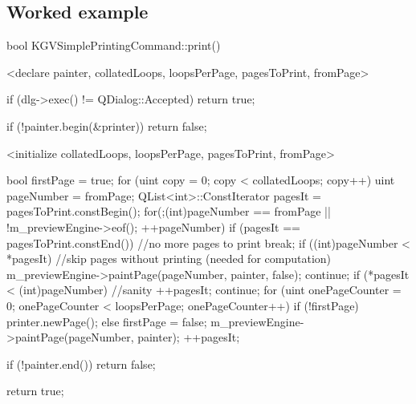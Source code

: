 \documentclass[10pt]{amsart}
\begin{document}
\subsection{Worked example}

\begin{codex}
\begin{offsideBlue}
\begin{PVerbatim}
  bool KGVSimplePrintingCommand::print()
  {
    <declare painter, collatedLoops, loopsPerPage,
             pagesToPrint, fromPage>

    if (dlg->exec() != QDialog::Accepted) {
      return true;
    }

    if (!painter.begin(&printer))
    {
      return false;
    }

    <initialize collatedLoops, loopsPerPage, pagesToPrint,
                fromPage>

    bool firstPage = true;
    for (uint copy = 0; copy < collatedLoops; copy++)
    {
      uint pageNumber = fromPage;
      QList<int>::ConstIterator pagesIt = pagesToPrint.constBegin();
      for(;(int)pageNumber == fromPage || !m_previewEngine->eof(); ++pageNumber)
      {
        if (pagesIt == pagesToPrint.constEnd()) //no more pages to print
          break;
        if ((int)pageNumber < *pagesIt)
        { //skip pages without printing (needed for computation)
          m_previewEngine->paintPage(pageNumber, painter, false);
          continue;
        }
        if (*pagesIt < (int)pageNumber) { //sanity
          ++pagesIt;
          continue;
        }
        for (uint onePageCounter = 0; onePageCounter < loopsPerPage; onePageCounter++) {
          if (!firstPage)
            printer.newPage();
          else
            firstPage = false;
          m_previewEngine->paintPage(pageNumber, painter);
        }
        ++pagesIt;
      }
    }

    if (!painter.end()) {
      return false;
    }

    return true;
  }
\end{PVerbatim}
\end{offsideBlue}
\end{codex}
\end{document}
